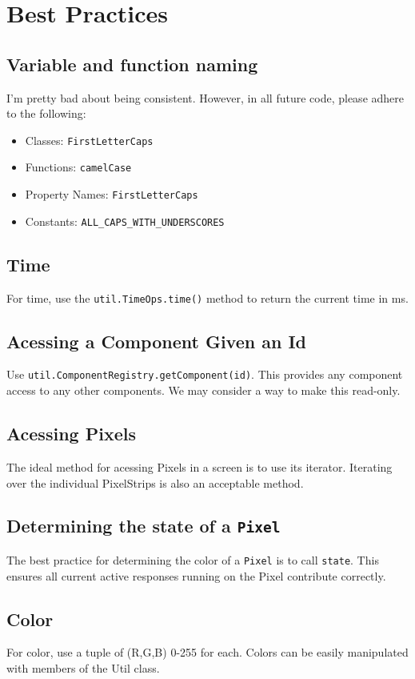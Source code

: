 \documentclass{article}
\begin{document}
    \section{Best Practices}
        \subsection{Variable and function naming}
            I'm pretty bad about being consistent.  However, in all future
            code, please adhere to the following:
            \begin{itemize}
                \item Classes: \texttt{FirstLetterCaps}
                \item Functions: \texttt{camelCase}
                \item Property Names: \texttt{FirstLetterCaps}
                \item Constants: \texttt{ALL\_CAPS\_WITH\_UNDERSCORES}
            \end{itemize}
        \subsection{Time}
            For time, use the \texttt{util.TimeOps.time()} method to return the current
            time in ms.
        \subsection{Acessing a Component Given an Id}
            Use \texttt{util.ComponentRegistry.getComponent(id)}.  This provides any
            component access to any other components.  We may consider a way to
            make this read-only.
        \subsection{Acessing Pixels}
            The ideal method for acessing Pixels in a screen is to use its
            iterator.  Iterating over the individual PixelStrips is also an
            acceptable method.  
        \subsection{Determining the state of a \texttt{Pixel}}
            The best practice for determining the color of a \texttt{Pixel} is to call
            \texttt{state}.  This ensures
            all current active responses running on the Pixel contribute correctly. 
        \subsection{Color}
            For color, use a tuple of (R,G,B) 0-255 for each.  Colors can be
            easily manipulated with members of the Util class.
\end{document}
